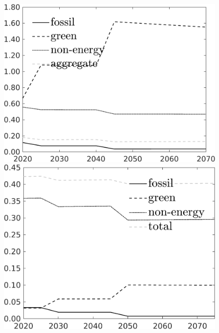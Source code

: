 \begin{figure}[h!!]
	\begin{minipage}[]{0.32\textwidth}
		\includegraphics[width=1\textwidth]{../../codding_model/own_basedOnFried/optimalPol_elastS_DisuSci/figures/all_1705/SingleJointTOT_OPT_T_NoTaus_Growth_spillover0_sep1_BN0_ineq0_red0_etaa0.79_lgd1.png}
	\end{minipage}
	\begin{minipage}[]{0.32\textwidth}
		\includegraphics[width=1\textwidth]{../../codding_model/own_basedOnFried/optimalPol_elastS_DisuSci/figures/all_1705/SingleJointTOT_OPT_T_NoTaus_Science_spillover0_sep1_BN0_ineq0_red0_etaa0.79_lgd1.png}

\end{minipage}
\end{figure}
